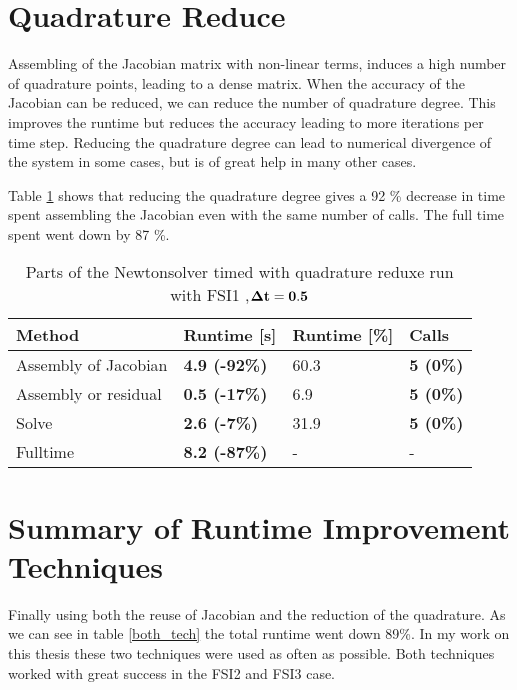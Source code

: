 \section{Quadrature Reduce}
Assembling of the Jacobian matrix with non-linear terms, induces a high number of quadrature points, leading to a dense matrix. When the accuracy of the Jacobian can be reduced, we can reduce the number of quadrature degree. This improves the runtime but reduces the accuracy leading to more iterations per time step. Reducing the quadrature degree can lead to numerical divergence of the system in some cases, but is of great help in many other cases.\newline

Table \ref{tab:quadreduce} shows that reducing the quadrature degree gives a 92 \% decrease in time spent assembling the Jacobian even with the same number of calls. The full time spent went down by 87 \%.
\begin{table}[H]
\centering
\caption{Parts of the Newtonsolver timed with quadrature reduxe run with FSI1 ,$\bold{\Delta t = 0.5}$}
\label{tab:quadreduce}
\begin{tabular}{|l|l|l|l|}
\hline
Method & \textbf{Runtime {[}s{]}} & Runtime {[}\%{]} & \textbf{Calls} \\ \hline
Assembly of Jacobian & \textbf{4.9 (-92\%)} & 60.3 & \textbf{5 (0\%)} \\ \hline
Assembly or residual & \textbf{0.5 (-17\%)} & 6.9 & \textbf{5 (0\%)} \\ \hline
Solve & \textbf{2.6 (-7\%)} & 31.9 & \textbf{5 (0\%)} \\ \hline
Fulltime & \textbf{8.2 (-87\%)} & - & - \\ \hline
\end{tabular}
\end{table}


\section{Summary of Runtime Improvement Techniques}
Finally using both the reuse of Jacobian and the reduction of the quadrature. As we can see in table \ref{both_tech} the total runtime went down 89\%. In my work on this thesis these two techniques were used as often as possible. Both techniques worked with great success in the FSI2 and FSI3 case.

